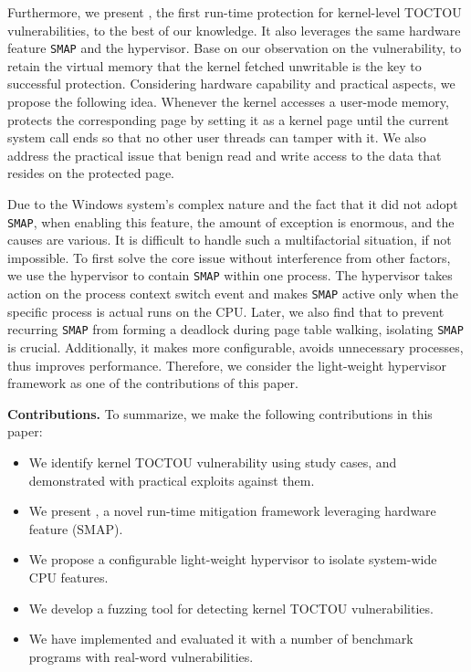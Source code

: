 Furthermore, we present \name, the first run-time protection for kernel-level TOCTOU vulnerabilities, to the best of our knowledge. It also leverages the same hardware feature \texttt{SMAP} and the hypervisor. Base on our observation on the vulnerability, to retain the virtual memory that the kernel fetched unwritable is the key to successful protection. Considering hardware capability and practical aspects, we propose the following idea. Whenever the kernel accesses a user-mode memory, \name protects the corresponding page by setting it as a kernel page until the current system call ends so that no other user threads can tamper with it. We also address the practical issue that benign read and write access to the data that resides on the protected page.


Due to the Windows system's complex nature and the fact that it did not adopt \texttt{SMAP}, when enabling this feature, the amount of exception is enormous, and the causes are various. It is difficult to handle such a multifactorial situation, if not impossible. To first solve the core issue without interference from other factors, we use the hypervisor to contain \texttt{SMAP} within one process. The hypervisor takes action on the process context switch event and makes \texttt{SMAP} active only when the specific process is actual runs on the CPU. Later, we also find that to prevent recurring \texttt{SMAP} from forming a deadlock during page table walking, isolating \texttt{SMAP} is crucial. Additionally, it makes \name more configurable, avoids unnecessary processes, thus improves performance. Therefore, we consider the light-weight hypervisor framework as one of the contributions of this paper. 

\textbf{Contributions.} To summarize, we make the following contributions in this paper:
\begin{itemize}[leftmargin=*]
    \item We identify kernel TOCTOU vulnerability using study cases, and demonstrated with practical exploits against them. 
    \item We present \name, a novel run-time mitigation framework leveraging hardware feature (SMAP). 
    \item We propose a configurable light-weight hypervisor to isolate system-wide CPU features.
    \item We develop a fuzzing tool for detecting kernel TOCTOU vulnerabilities.
    \item We have implemented \name and evaluated it with a number of benchmark programs with real-word vulnerabilities.
  
\end{itemize}


